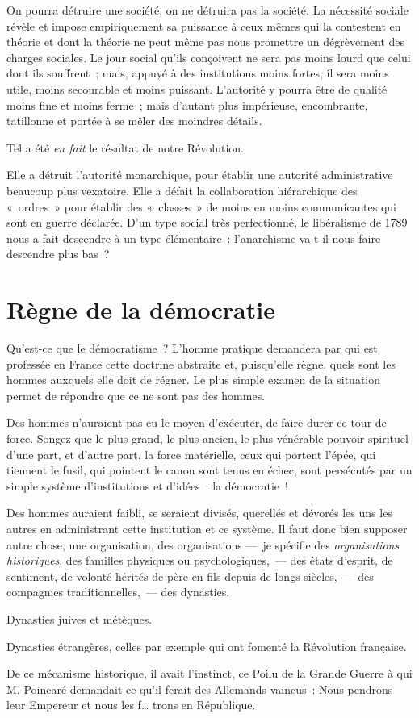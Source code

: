 \documentclass[french,twoside]{book} %
\newcommand{\astermono}{\medskip\centerline{\color{rubric}\large\selectfont{\syms ✻}}\medskip\par}%
\begin{document}
\astermono

\noindent On pourra détruire une société, on ne détruira pas la société. La nécessité sociale révèle et impose empiriquement sa puissance à ceux mêmes qui la contestent en théorie et dont la théorie ne peut même pas nous promettre un dégrèvement des charges sociales. Le jour social qu’ils conçoivent ne sera pas moins lourd que celui dont ils souffrent ; mais, appuyé à des institutions moins fortes, il sera moins utile, moins secourable et moins puissant. L’autorité y pourra être de qualité moins fine et moins ferme ; mais d’autant plus impérieuse, encombrante, tatillonne et portée à se mêler des moindres détails.\par
Tel a été \emph{en fait} le résultat de notre Révolution.\par
Elle a détruit l’autorité monarchique, pour établir une autorité administrative beaucoup plus vexatoire. Elle a défait la collaboration hiérarchique des « ordres » pour établir des « classes » de moins en moins communicantes qui sont en guerre déclarée. D’un type social très perfectionné, le libéralisme de 1789 nous a fait descendre à un type élémentaire : l’anarchisme va-t-il nous faire descendre plus bas ?
\section[{Règne de la démocratie}]{Règne de la démocratie}
\noindent Qu’est-ce que le démocratisme ? L’homme pratique demandera par qui est professée en France cette doctrine abstraite et, puisqu’elle règne, quels sont les hommes auxquels elle doit de régner. Le plus simple examen de la situation permet de répondre que ce ne sont pas des hommes.\par
Des hommes n’auraient pas eu le moyen d’exécuter, de faire durer ce tour de force. Songez que le plus grand, le plus ancien, le plus vénérable pouvoir spirituel d’une part, et d’autre part, la force matérielle, ceux qui portent l’épée, qui tiennent le fusil, qui pointent le canon sont tenus en échec, sont persécutés par un simple système d’institutions et d’idées : la démocratie !\par
Des hommes auraient faibli, se seraient divisés, querellés et dévorés les uns les autres en administrant cette institution et ce système. Il faut donc bien supposer autre chose, une organisation, des organisations — je spécifie des \emph{organisations historiques}, des familles physiques ou psychologiques, — des états d’esprit, de sentiment, de volonté hérités de père en fils depuis de longs siècles, — des compagnies traditionnelles, — des dynasties.\par
Dynasties juives et métèques.\par
Dynasties étrangères, celles par exemple qui ont fomenté la Révolution française.\par
De ce mécanisme historique, il avait l’instinct, ce Poilu de la Grande Guerre à qui M. Poincaré demandait ce qu’il ferait des Allemands vaincus : Nous pendrons leur Empereur et nous les f… trons en République.\par
\end{document}
